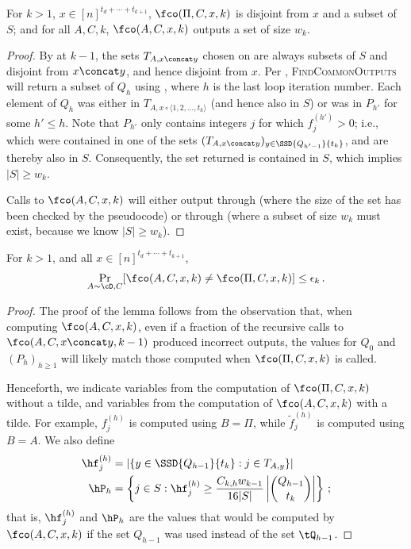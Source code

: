 \begin{itemize}
\begin{itemize}
\begin{lemma}\label{lem:pd-step-case-aux}
  For $k > 1$, $x \in [n]^{t_d+\cdots+t_{k+1}}$, $\fco(\Pi, C, x, k)$ is
  disjoint from $x$ and a subset of $S$; and for all $A, C, k$,
  $\fco(A,C,x,k)$ outputs a set of size $w_k$.
\end{lemma}
%
\begin{proof}%
  By  at $k - 1$, the sets $T_{A,x \concat y}$
  chosen on  are always subsets of $S$ and
  disjoint from $x \concat y$, and hence disjoint from $x$. Per
  , \textsc{FindCommonOutputs} will return a subset of
  $Q_h$ using , where $h$ is the last loop
  iteration number. Each element of $Q_h$ was either in $T_{A,x \circ \langle
  1,2,\ldots,t_k\rangle}$ (and hence also in $S$) or was in $P_{h'}$ for some
  $h' \le h$. Note that $P_{h'}$ only contains integers $j$ for which
  $f_j^{(h')} > 0$; i.e., which were contained in one of the sets $(T_{A,x
  \concat y})_{y \in \SSD{Q_{h'-1}}{t_k}}$, and are thereby also in $S$.
  Consequently, the set returned is contained in $S$, which implies $|S| \ge
  w_k$.

  Calls to $\fco(A,C,x,k)$ will either output through
   (where the size of the set has been checked by
  the pseudocode) or through  (where a subset of
  size $w_k$ must exist, because we know $|S| \ge w_k$).
\end{proof}

\begin{lemma}\label{lem:pd-stability}
  For $k > 1$, and all $x \in [n]^{t_d + \cdots + t_{k+1}}$, 
  \begin{align*}
    \Pr_{A \sim \cD, C}[\fco(A, C, x, k) \ne \fco(\Pi, C, x, k)] \le \epsilon_k \,.
  \end{align*}
\end{lemma}
%
\begin{proof}%
  The proof of the lemma follows from the observation that, when computing
  $\fco(A,C,x,k)$, even if a fraction of the recursive calls to $\fco(A,C,x
  \concat y,k-1)$ produced incorrect outputs, the values for $Q_0$ and $(P_h)_{h \ge 1}$ will likely match those computed when $\fco(\Pi,C,x,k)$ is called.
  
  Henceforth, we indicate variables from the computation of $\fco(\Pi,C,x,k)$ without a tilde,
  and variables from the computation of $\fco(A,C,x,k)$ with a tilde. For example, $f_j^{(h)}$
  is computed using $B = \Pi$, while $\tilde{f}_j^{(h)}$ is computed using $B = A$. We also define
  \begin{align*}
    \hf_j^{(h)} &= \left|\left\{ y \in \SSD{Q_{h-1}}{t_k} : j \in T_{A,y} \right\}\right| \\
    \hP_h &= \left\{j \in S : \hf_j^{(h)} \ge \frac{C_{k,h} w_{k-1}}{16 |S|} \left|\binom{Q_{h-1}}{t_k}\right| \right\} \,;
  \end{align*}
  that is, $\hf_j^{(h)}$ and $\hP_h$ are the values that would be computed by $\fco(A,C,x,k)$ if the set $Q_{h-1}$ was used instead of the set $\tQ_{h-1}$.
  

\end{proof}
\end{itemize}
\end{itemize}
